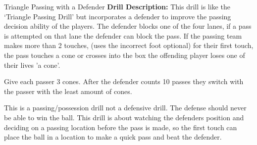 \begin{evenBlock}{Triangle Passing with a Defender}
\textbf{Drill Description:}
        This drill is like the `Triangle Passing Drill' but incorporates a defender to improve the passing decision ability of the players.  The defender blocks one of the four lanes, if a pass is attempted on that lane the defender can block the pass.  If the passing team makes more than 2 touches, (uses the incorrect foot optional) for their first touch, the pass touches a cone or crosses into the box the offending player loses one of their lives 'a cone'.

        Give each passer 3 cones.  After the defender counts 10 passes they switch with the passer with the least amount of cones.

        This is a passing/possession drill not a defensive drill. The defense should never be able to win the ball.  This drill is about watching the defenders position and deciding on a passing location before the pass is made, so the first touch can place the ball in a location to make a quick pass and beat the defender.


\end{evenBlock}
